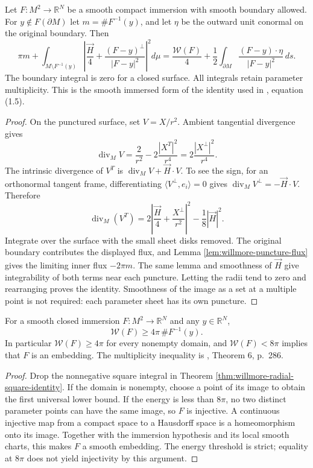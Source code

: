 \begin{theorem}\label{thm:willmore-radial-square-identity}
Let $F:M^2\to\mathbb R^N$ be a smooth compact immersion with smooth boundary allowed. For $y\notin F(\partial M)$ let $m=\#F^{-1}(y)$, and let $\eta$ be the outward unit conormal on the original boundary. Then
\[
 \pi m+\int_{M\setminus F^{-1}(y)}
 \left|\frac{\vec H}{4}+\frac{(F-y)^\perp}{|F-y|^2}\right|^2d\mu
 =\frac{\mathcal W(F)}4+
 \frac12\int_{\partial M}\frac{(F-y)\cdot\eta}{|F-y|^2}\,ds.
\]
The boundary integral is zero for a closed surface. All integrals retain parameter multiplicity. This is the smooth immersed form of the identity used in \cite{SimW93}, equation (1.5).
\end{theorem}
\begin{proof}
On the punctured surface, set $V=X/r^2$. Ambient tangential divergence gives
\[
 \operatorname{div}_M V=\frac2{r^2}-2\frac{|X^T|^2}{r^4}
 =2\frac{|X^\perp|^2}{r^4}.
\]
The intrinsic divergence of $V^T$ is $\operatorname{div}_MV+\vec H\cdot V$. To see the sign, for an orthonormal tangent frame, differentiating $\langle V^\perp,e_i\rangle=0$ gives $\operatorname{div}_MV^\perp=-\vec H\cdot V$. Therefore
\[
 \operatorname{div}_M(V^T)
 =2\left|\frac{\vec H}{4}+\frac{X^\perp}{r^2}\right|^2-\frac18|\vec H|^2.
\]
Integrate over the surface with the small sheet disks removed. The original boundary contributes the displayed flux, and Lemma \ref{lem:willmore-puncture-flux} gives the limiting inner flux $-2\pi m$. The same lemma and smoothness of $\vec H$ give integrability of both terms near each puncture. Letting the radii tend to zero and rearranging proves the identity. Smoothness of the image as a set at a multiple point is not required: each parameter sheet has its own puncture.
\end{proof}

\begin{theorem}\label{thm:li-yau-smooth-multiplicity}
For a smooth closed immersion $F:M^2\to\mathbb R^N$ and any $y\in\mathbb R^N$,
\[
 \mathcal W(F)\geq4\pi\,\#F^{-1}(y).
\]
In particular $\mathcal W(F)\geq4\pi$ for every nonempty domain, and $\mathcal W(F)<8\pi$ implies that $F$ is an embedding. The multiplicity inequality is \cite{LY82}, Theorem 6, p.~286.
\end{theorem}
\begin{proof}
Drop the nonnegative square integral in Theorem \ref{thm:willmore-radial-square-identity}. If the domain is nonempty, choose a point of its image to obtain the first universal lower bound. If the energy is less than $8\pi$, no two distinct parameter points can have the same image, so $F$ is injective. A continuous injective map from a compact space to a Hausdorff space is a homeomorphism onto its image. Together with the immersion hypothesis and its local smooth charts, this makes $F$ a smooth embedding. The energy threshold is strict; equality at $8\pi$ does not yield injectivity by this argument.
\end{proof}

